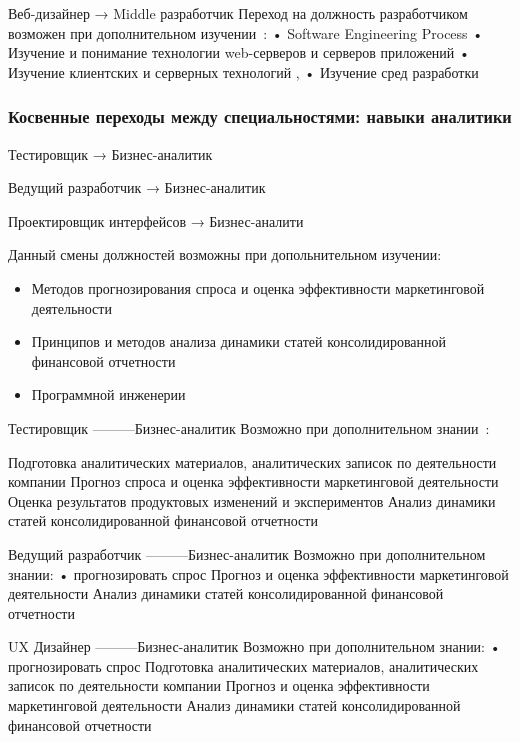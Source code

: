 \documentclass{../industrial-development}
\begin{document}
\lecturenotes

Веб-дизайнер →  Middle разработчик
Переход на должность разработчиком возможен при дополнительном изучении~\cite{rab}:
•	Software Engineering Process
•	Изучение и понимание технологии web-серверов и серверов приложений
•	Изучение клиентских и серверных технологий , 
•	Изучение сред разработки


\begin{frame} \frametitle{Косвенные переходы между специальностями: навыки аналитики }

\begin{block}{Тестировщик → Бизнес-аналитик  

Ведущий разработчик → Бизнес-аналитик  

Проектировщик интерфейсов → Бизнес-аналити}

Данный смены должностей возможны при допольнительном изучении:
  \end{block}
 \begin{itemize}
\item Методов прогнозирования спроса и оценка эффективности маркетинговой деятельности
\item Принципов и методов анализа динамики статей консолидированной финансовой отчетности
\item Программной инженерии
 \end{itemize}
\end{frame}

\lecturenotes


Тестировщик ---------Бизнес-аналитик
Возможно при дополнительном знании~\cite{rab}:

 Подготовка аналитических материалов, аналитических записок по деятельности компании
Прогноз спроса и оценка эффективности маркетинговой деятельности
 Оценка результатов продуктовых изменений и экспериментов
Анализ динамики статей консолидированной финансовой отчетности

Ведущий разработчик ---------Бизнес-аналитик
Возможно при дополнительном знании:
•	прогнозировать спрос 
 Прогноз и оценка эффективности маркетинговой деятельности
 Анализ динамики статей консолидированной финансовой отчетности

UX Дизайнер ---------Бизнес-аналитик
Возможно при дополнительном знании:
•	прогнозировать спрос 
Подготовка аналитических материалов, аналитических записок по деятельности компании
 Прогноз и оценка эффективности маркетинговой деятельности
 Анализ динамики статей консолидированной финансовой отчетности
\end{document}
